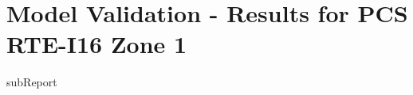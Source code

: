 




    \section{Model Validation - Results for PCS RTE-I16 Zone 1}

    {{subReport}}
    \newpage

